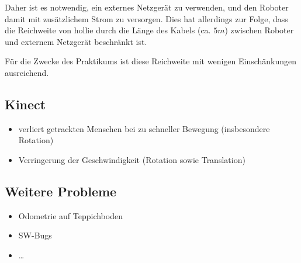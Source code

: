 Daher ist es notwendig, ein externes Netzgerät zu verwenden, und den Roboter damit mit zusätzlichem Strom zu versorgen.
Dies hat allerdings zur Folge, dass die Reichweite von \gls{hollie} durch die Länge des Kabels (ca. $5m$) zwischen Roboter und externem Netzgerät beschränkt ist.

Für die Zwecke des Praktikums ist diese Reichweite mit wenigen Einschänkungen ausreichend.




\subsection{Kinect}

\begin{itemize}
	\item verliert getrackten Menschen bei zu schneller Bewegung (insbesondere Rotation)
	\item Verringerung der Geschwindigkeit (Rotation sowie Translation)
\end{itemize}


\subsection{Weitere Probleme}

\begin{itemize}
	\item Odometrie auf Teppichboden
	\item SW-Bugs
	\item \ldots
\end{itemize}
